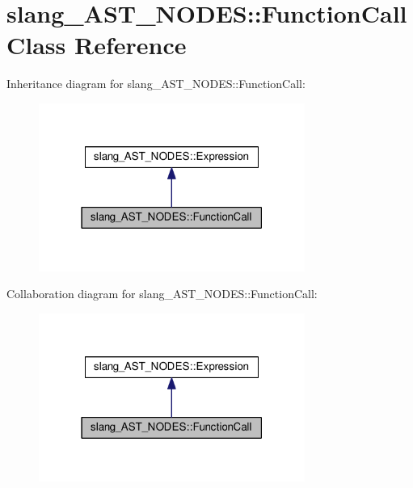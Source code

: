 \hypertarget{classslang__AST__NODES_1_1FunctionCall}{}\section{slang\+\_\+\+A\+S\+T\+\_\+\+N\+O\+D\+ES\+:\+:Function\+Call Class Reference}
\label{classslang__AST__NODES_1_1FunctionCall}


Inheritance diagram for slang\+\_\+\+A\+S\+T\+\_\+\+N\+O\+D\+ES\+:\+:Function\+Call\+:
\nopagebreak
\begin{figure}[H]
\begin{center}
\leavevmode
\includegraphics[width=247pt]{classslang__AST__NODES_1_1FunctionCall__inherit__graph}
\end{center}
\end{figure}


Collaboration diagram for slang\+\_\+\+A\+S\+T\+\_\+\+N\+O\+D\+ES\+:\+:Function\+Call\+:
\nopagebreak
\begin{figure}[H]
\begin{center}
\leavevmode
\includegraphics[width=247pt]{classslang__AST__NODES_1_1FunctionCall__coll__graph}
\end{center}
\end{figure}
